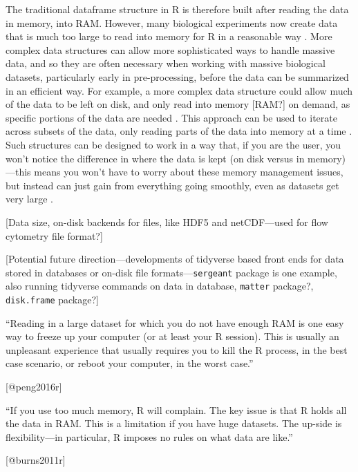 \documentclass[]{tufte-book}
\begin{document}
The traditional dataframe structure in R is therefore built after
reading the data in memory, into RAM. However, many biological experiments now create
data that is much too large to read into memory for R in a reasonable way
\citep{lawrence2014scalable, hicks2021mbkmeans}. More complex data structures can
allow more sophisticated ways to handle massive data, and so they are often
necessary when working with massive biological datasets, particularly early in
pre-processing, before the data can be summarized in an efficient way. For
example, a more complex data structure could allow much of the data to be left
on disk, and only read into memory {[}RAM?{]} on demand, as specific portions of the
data are needed \citep{gatto2013msnbase, hicks2021mbkmeans}. This approach can be
used to iterate across subsets of the data, only reading parts of the data into
memory at a time \citep{lawrence2014scalable}. Such structures can be designed to
work in a way that, if you are the user, you won't notice the difference in
where the data is kept (on disk versus in memory)---this means you won't have to
worry about these memory management issues, but instead can just gain from
everything going smoothly, even as datasets get very large \citep{gatto2013msnbase}.

{[}Data size, on-disk backends for files, like HDF5 and netCDF---used for flow
cytometry file format?{]}

{[}Potential future direction---developments of tidyverse based front ends for
data stored in databases or on-disk file formats---\texttt{sergeant} package is one
example, also running tidyverse commands on data in database, \texttt{matter} package?,
\texttt{disk.frame} package?{]}

\begin{marginfigure}
``Reading in a large dataset for which you do not have enough RAM is one
easy way to freeze up your computer (or at least your R session). This
is usually an unpleasant experience that usually requires you to kill
the R process, in the best case scenario, or reboot your computer, in
the worst case.''

{[}@peng2016r{]}
\end{marginfigure}

\begin{marginfigure}
``If you use too much memory, R will complain. The key issue is that R
holds all the data in RAM. This is a limitation if you have huge
datasets. The up-side is flexibility---in particular, R imposes no rules
on what data are like.''

{[}@burns2011r{]}
\end{marginfigure}
\end{document}
